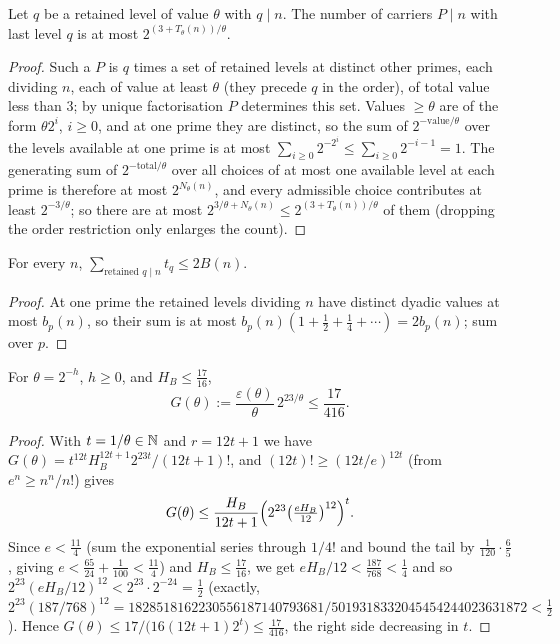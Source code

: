 \begin{lemma}\label{lem:carriercount}
Let $q$ be a retained level of value $\theta$ with $q\mid n$. The number of carriers $P\mid n$ with last level $q$ is at most
$2^{(3+T_\theta(n))/\theta}$.
\end{lemma}
\begin{proof}
Such a $P$ is $q$ times a set of retained levels at distinct other primes, each dividing $n$, each of value at least $\theta$ (they
precede $q$ in the order), of total value less than $3$; by unique factorisation $P$ determines this set. Values $\ge\theta$ are of the
form $\theta2^i$, $i\ge0$, and at one prime they are distinct, so the sum of $2^{-\mathrm{value}/\theta}$ over the levels available at one
prime is at most $\sum_{i\ge0}2^{-2^i}\le\sum_{i\ge0}2^{-i-1}=1$. The generating sum of $2^{-\mathrm{total}/\theta}$ over all choices of at
most one available level at each prime is therefore at most $2^{N_\theta(n)}$, and every admissible choice contributes at least
$2^{-3/\theta}$; so there are at most $2^{3/\theta+N_\theta(n)}\le2^{(3+T_\theta(n))/\theta}$ of them (dropping the order restriction only
enlarges the count).
\end{proof}

\begin{lemma}\label{lem:valuesum}
For every $n$, $\sum_{\text{retained }q\mid n}t_q\le2B(n)$.
\end{lemma}
\begin{proof}
At one prime the retained levels dividing $n$ have distinct dyadic values at most $b_p(n)$, so their sum is at most
$b_p(n)(1+\tfrac12+\tfrac14+\cdots)=2b_p(n)$; sum over $p$.
\end{proof}

\begin{lemma}\label{lem:G}
For $\theta=2^{-h}$, $h\ge0$, and $H_B\le\tfrac{17}{16}$,
\begin{equation}\label{eq:G}
G(\theta):=\frac{\varepsilon(\theta)}{\theta}\,2^{23/\theta}\le\frac{17}{416}.
\end{equation}
\end{lemma}
\begin{proof}
With $t=1/\theta\in\mathbb{N}$ and $r=12t+1$ we have $G(\theta)=t^{12t}H_B^{12t+1}2^{23t}/(12t+1)!$, and $(12t)!\ge(12t/e)^{12t}$ (from
$e^n\ge n^n/n!$) gives
\[
G(\theta)\le\frac{H_B}{12t+1}\Bigl(2^{23}\bigl(\tfrac{eH_B}{12}\bigr)^{12}\Bigr)^t .
\]
Since $e<\tfrac{11}4$ (sum the exponential series through $1/4!$ and bound the tail by $\tfrac1{120}\cdot\tfrac65$, giving
$e<\tfrac{65}{24}+\tfrac1{100}<\tfrac{11}4$) and $H_B\le\tfrac{17}{16}$, we get $eH_B/12<\tfrac{187}{768}<\tfrac14$ and so
$2^{23}(eH_B/12)^{12}<2^{23}\cdot2^{-24}=\tfrac12$ (exactly,
$2^{23}(187/768)^{12}=1828518162230556187140793681/5019318332045454244023631872<\tfrac12$). Hence
$G(\theta)\le17/\bigl(16(12t+1)2^t\bigr)\le\tfrac{17}{416}$, the right side decreasing in $t$.
\end{proof}

